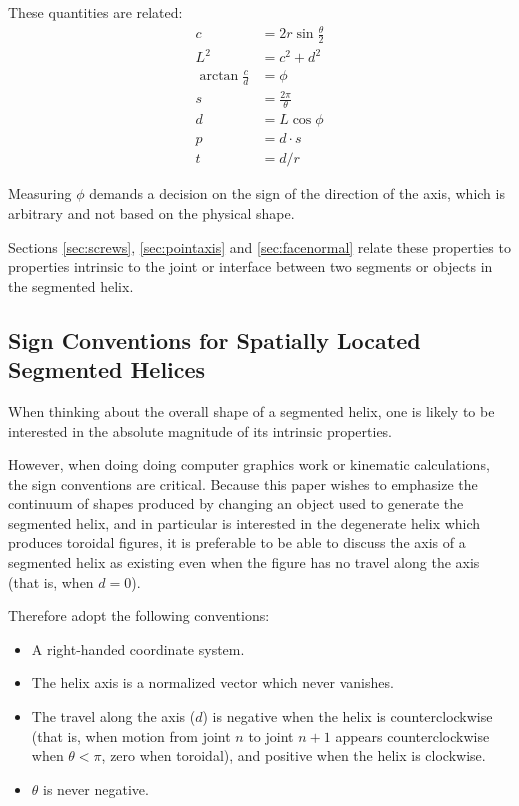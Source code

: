 \documentclass[11pt]{article}
\begin{document}
{\begin{itemize}
  \end{itemize}
These quantities are related:
\begin{align}
    c &= 2r\sin{\frac{\theta}{2}} \\
    L^2 &= c^2+d^2  \\
    \arctan{\frac{c}{d}}  &= \phi \\
    s &= \frac{2 \pi}{\theta} \\
    d &= L \cos{\phi} \\
    p &= d \cdot s \\
    t &= d / r
\end{align}

Measuring $\phi$ demands a decision on the sign of the direction of the axis,
which is arbitrary and not based on the
physical shape.

Sections \ref{sec:screws}, \ref{sec:pointaxis} and \ref{sec:facenormal}
relate these properties to properties intrinsic to the joint or interface between
two segments or objects in the segmented helix.

\label{sec:SegmentedHelix}

\subsection{Sign Conventions for Spatially Located Segmented Helices}

When thinking about the overall shape of a segmented helix, one is
likely to be interested in the absolute magnitude of its intrinsic
properties.

However, when doing doing computer graphics work or kinematic
calculations, the sign conventions are critical. Because this
paper wishes to emphasize the continuum of shapes produced by
changing an object used to generate the segmented helix, and
in particular is interested in the degenerate helix which
produces toroidal figures, it is preferable to be able to discuss
the axis of a segmented helix as existing even when the
figure has no travel along the axis (that is, when $d = 0$).

Therefore adopt the following conventions:
\begin{itemize}
\item A right-handed coordinate system.
\item The helix axis is a normalized vector
  which never vanishes.
\item The travel along the axis ($d$) is negative when
  the helix is counterclockwise (that is, when motion from
  joint $n$ to joint $n+1$ appears counterclockwise when $\theta < \pi$,
  zero when toroidal), and
  positive when the helix is clockwise.
\item $\theta$ is never negative.
\end{itemize}

}
\end{document}
